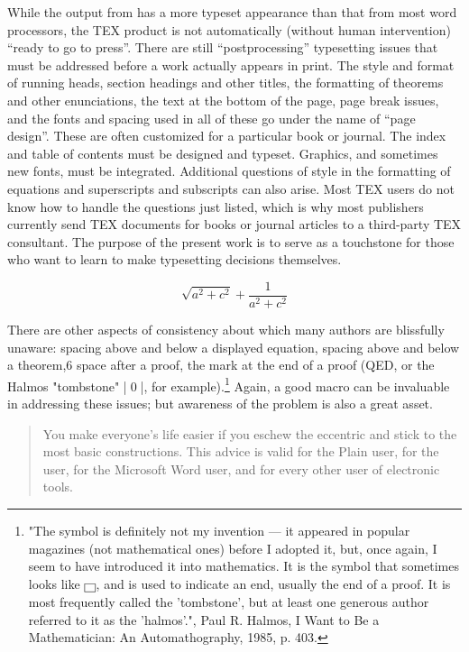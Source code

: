 {While the output from \tex has a more typeset appearance than that
from most word processors, the TEX product is not automatically (without human intervention) \enquote{ready to go to press}. There are still \enquote{postprocessing} typesetting issues that must be addressed before a work
actually appears in print. The style and format of running heads, section headings and other titles, the formatting of theorems and other
enunciations, the text at the bottom of the page, page break issues, and
the fonts and spacing used in all of these go under the name of “page design”. These are often customized for a particular book or journal. The
index and table of contents must be designed and typeset. Graphics,
and sometimes new fonts, must be integrated. Additional questions of
style in the formatting of equations and superscripts and subscripts can
also arise. Most TEX users do not know how to handle the questions just
listed, which is why most publishers currently send TEX documents for
books or journal articles to a third-party TEX consultant. The purpose
of the present work is to serve as a touchstone for those who want to
learn to make typesetting decisions themselves.


\def\smsqr#1#2{\sqrt{{#1}^2 + {#2}^2} + \frac{1}{{#1}^2 + {#2}^2}}

\[ \smsqr{a}{c} \]

There are other aspects of consistency about which many authors
are blissfully unaware: spacing above and below a displayed equation,
spacing above and below a theorem,6
space after a proof, the mark at
the end of a proof (QED, or the Halmos "tombstone" |\qed|, for example).\footnote{ "The symbol is definitely not my invention — it appeared in popular magazines (not mathematical ones) before I adopted it, but, once again, I seem to have introduced it into mathematics. It is the symbol that sometimes looks like \(\boxed{\thinspace}\), and is used to indicate an end, usually the end of a proof. It is most frequently called the 'tombstone', but at least one generous author referred to it as the 'halmos'.", Paul R. Halmos, I Want to Be a Mathematician: An Automathography, 1985, p. 403.}
Again, a good macro can be invaluable in addressing these issues; but
awareness of the problem is also a great asset.

\begin{quotation}
You make everyone's
life easier if you eschew the eccentric and stick to the most basic constructions. This advice is valid for the Plain \tex user, for the \latex
user, for the Microsoft Word user, and for every other user of electronic
tools.
\end{quotation}



}
